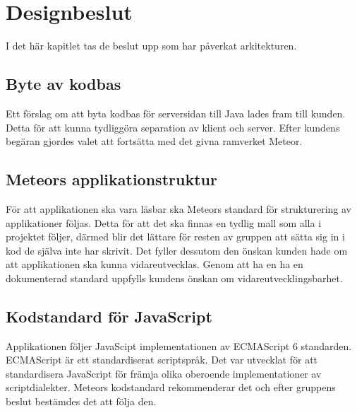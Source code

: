 \section{Designbeslut}
I det här kapitlet tas de beslut upp som har påverkat arkitekturen.
\subsection{Byte av kodbas}
Ett förslag om att byta kodbas för serversidan till Java lades fram till kunden. Detta för att kunna tydliggöra separation av klient och server. Efter kundens begäran gjordes valet att fortsätta med det givna ramverket Meteor.
\subsection{Meteors applikationstruktur}
För att applikationen ska vara läsbar ska Meteors standard för strukturering av applikationer följas.\cite{website:meteorstructure} Detta för att det ska finnas en tydlig mall som alla i projektet följer, därmed blir det lättare för resten av gruppen att sätta sig in i kod de själva inte har skrivit. Det fyller dessutom den önskan kunden hade om att applikationen ska kunna vidareutvecklas. Genom att ha en ha en dokumenterad standard uppfylls kundens önskan om vidareutvecklingsbarhet.
\subsection{Kodstandard för JavaScript}
Applikationen följer JavaScipt implementationen av ECMAScript 6 standarden.\cite{website:ecmascript} ECMAScript är ett standardiserat scriptspråk. Det var utvecklat för att standardisera JavaScript för främja olika oberoende implementationer av scriptdialekter. Meteors kodstandard rekommenderar det och efter gruppens beslut bestämdes det att följa den.
